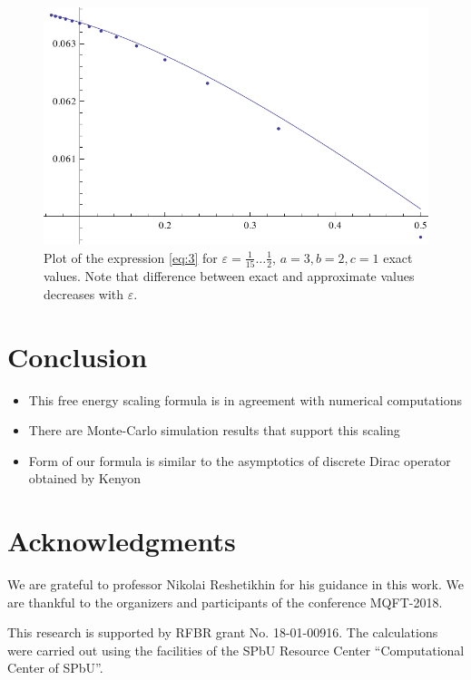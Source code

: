 \documentclass{article}
\begin{document}
  \begin{figure}[h!tb]
    \includegraphics{exact-vs-expansion.pdf}
    \caption{Plot of the expression \eqref{eq:3} for $\varepsilon=\frac{1}{15}\dots\frac{1}{2}$, $a=3,b=2,c=1$
      exact values. Note that difference between exact and approximate values decreases with
      $\varepsilon$.}
  \end{figure}

\section*{Conclusion}
\label{sec:conclusion}

  \begin{itemize}
  \item This free energy scaling formula is in agreement with numerical computations
  \item There are Monte-Carlo simulation results that support this scaling
  \item Form of our formula is similar to the asymptotics of discrete Dirac operator obtained by Kenyon
  \end{itemize}

\section*{Acknowledgments}
\label{sec:acknowledgements}
We are grateful to professor Nikolai Reshetikhin for his guidance in this work.
We are thankful to the organizers and participants of the conference MQFT-2018.

This research is supported by RFBR grant No. 18-01-00916.
The calculations were carried out using the facilities of the SPbU Resource Center ``Computational Center of SPbU''.


{} 
\end{document}
